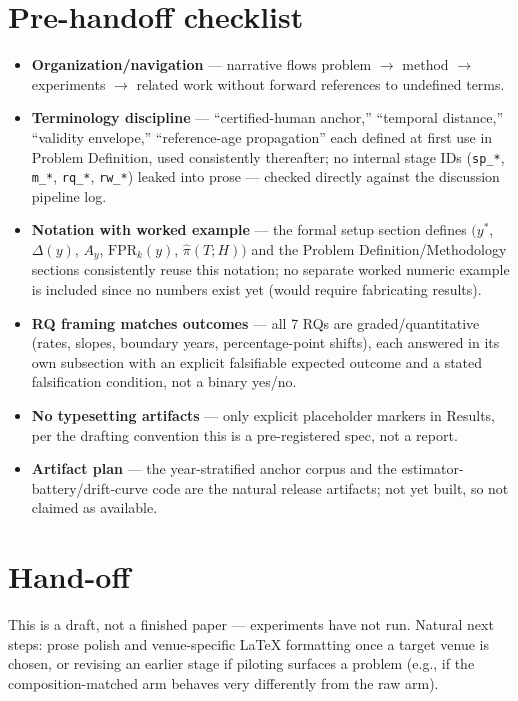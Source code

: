 \documentclass[11pt]{article}
\begin{document}
\section*{Pre-handoff checklist}
\begin{itemize}[leftmargin=1.4em]
\item \textbf{Organization/navigation} --- narrative flows problem $\to$ method $\to$ experiments $\to$ related work without forward references to undefined terms.
\item \textbf{Terminology discipline} --- ``certified-human anchor,'' ``temporal distance,'' ``validity envelope,'' ``reference-age propagation'' each defined at first use in Problem Definition, used consistently thereafter; no internal stage IDs (\texttt{sp\_*}, \texttt{m\_*}, \texttt{rq\_*}, \texttt{rw\_*}) leaked into prose --- checked directly against the discussion pipeline log.
\item \textbf{Notation with worked example} --- the formal setup section defines $(y^*$, $\Delta(y)$, $A_y$, $\mathrm{FPR}_k(y)$, $\hat{\pi}(T; H))$ and the Problem Definition/Methodology sections consistently reuse this notation; no separate worked numeric example is included since no numbers exist yet (would require fabricating results).
\item \textbf{RQ framing matches outcomes} --- all 7 RQs are graded/quantitative (rates, slopes, boundary years, percentage-point shifts), each answered in its own subsection with an explicit falsifiable expected outcome and a stated falsification condition, not a binary yes/no.
\item \textbf{No typesetting artifacts} --- only explicit placeholder markers in Results, per the drafting convention this is a pre-registered spec, not a report.
\item \textbf{Artifact plan} --- the year-stratified anchor corpus and the estimator-battery/drift-curve code are the natural release artifacts; not yet built, so not claimed as available.
\end{itemize}

\section*{Hand-off}
This is a draft, not a finished paper --- experiments have not run. Natural next steps: prose polish and venue-specific LaTeX formatting once a target venue is chosen, or revising an earlier stage if piloting surfaces a problem (e.g., if the composition-matched arm behaves very differently from the raw arm).
\end{document}
